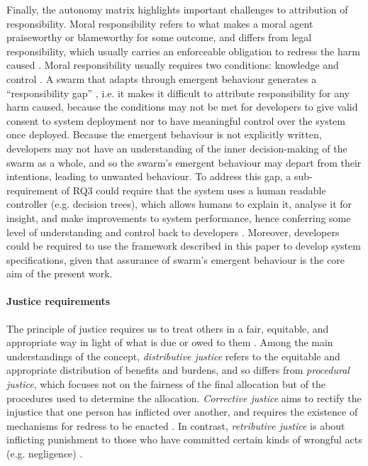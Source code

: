\documentclass[lettersize,journal]{IEEEtran}
\begin{document}
Finally, the autonomy matrix highlights important challenges to attribution of responsibility. Moral responsibility refers to what makes a moral agent praiseworthy or blameworthy for some outcome, and differs from legal responsibility, which usually carries an enforceable obligation to redress the harm caused \cite{burton2020mind}. Moral responsibility usually requires two conditions: knowledge and control \cite{santoni2021four}. A swarm that adapts through emergent behaviour generates a ``responsibility gap” \cite{matthias2004responsibility}, i.e. it makes it difficult to attribute responsibility for any harm caused, because the conditions may not be met for developers to give valid consent to system deployment nor to have meaningful control over the system once deployed. Because the emergent behaviour is not explicitly written, developers may not have an understanding of the inner decision-making of the swarm as a whole, and so the swarm’s emergent behaviour may depart from their intentions, leading to unwanted behaviour. To address this gap, a sub-requirement of RQ3 could require that the system uses a human readable controller (e.g. decision trees), which allows humans to explain it, analyse it for insight, and make improvements to system performance, hence conferring some level of understanding and control back to developers \cite{jones2019onboard}. Moreover, developers could be required to use the framework described in this paper to develop system specifications, given that assurance of swarm’s emergent behaviour is the core aim of the present work. 
\\
\paragraph*{Justice requirements}
The principle of justice requires us to treat others in a fair, equitable, and appropriate way in light of what is due or owed to them \cite{beauchamp2019principles}. Among the main understandings of the concept, \textit{distributive justice} refers to the equitable and appropriate distribution of benefits and burdens, and so differs from \textit{procedural justice}, which focuses not on the fairness of the final allocation but of the procedures used to determine the allocation. \textit{Corrective justice} aims to rectify the injustice that one person has inflicted over another, and requires the existence of mechanisms for redress to be enacted \cite{sep-justice}. In contrast, \textit{retributive justice} is about inflicting punishment to those who have committed certain kinds of wrongful acts (e.g. negligence) \cite{sep-justice-retributive}. 
\end{document}
